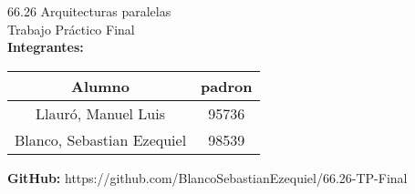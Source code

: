 \begin{titlepage}
    \vspace*{\fill}
    \begin{center}
        \Large 66.26 Arquitecturas paralelas \\
        \Huge Trabajo Práctico Final\\
        \bigskip\bigskip\bigskip
        \large\textbf{Integrantes:} \\
        \begin{center}
            \begin{tabular}{||c | c||}
                \hline
                Alumno & padron \\ [0.5ex]
                \hline\hline
                Llauró, Manuel Luis & 95736 \\
                \hline
                Blanco, Sebastian Ezequiel & 98539 \\
                \hline
            \end{tabular}
        \end{center}
        \textbf{GitHub:} https://github.com/BlancoSebastianEzequiel/66.26-TP-Final\\

    \end{center}
    \vspace*{\fill}
\end{titlepage}
